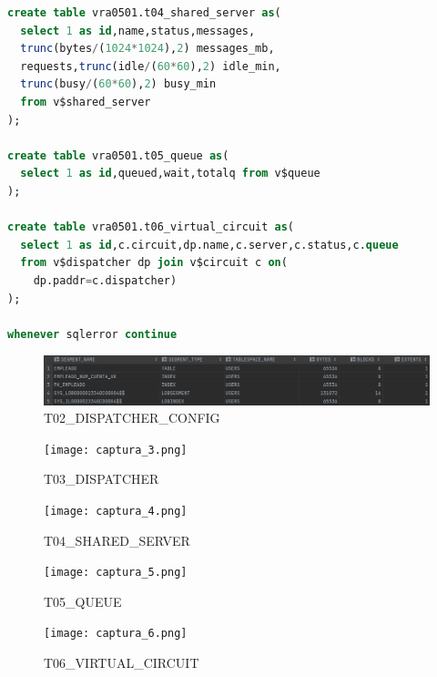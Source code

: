 \documentclass[journal]{IEEEtran}
\begin{document}
\begin{lstlisting}[language=sql, caption=s-03-consultas.sql,label={lst:codigo5}]
create table vra0501.t04_shared_server as(
  select 1 as id,name,status,messages,
  trunc(bytes/(1024*1024),2) messages_mb, 
  requests,trunc(idle/(60*60),2) idle_min,
  trunc(busy/(60*60),2) busy_min
  from v$shared_server
);

create table vra0501.t05_queue as(
  select 1 as id,queued,wait,totalq from v$queue
);

create table vra0501.t06_virtual_circuit as(
  select 1 as id,c.circuit,dp.name,c.server,c.status,c.queue
  from v$dispatcher dp join v$circuit c on( 
    dp.paddr=c.dispatcher)
);

whenever sqlerror continue
\end{lstlisting}
\begin{figure}[H]
  \centering
  \includegraphics[scale=.22]{captura_2.png}
   \caption{T02\_DISPATCHER\_CONFIG}
   \label{fig:validador_2}
\end{figure}
\begin{figure}[H]
  \centering
  \texttt{[image: captura\_3.png]}
   \caption{T03\_DISPATCHER}
   \label{fig:validador_3}
\end{figure}
\begin{figure}[H]
  \centering
  \texttt{[image: captura\_4.png]}
   \caption{T04\_SHARED\_SERVER}
   \label{fig:validador_4}
\end{figure}
\begin{figure}[H]
  \centering
  \texttt{[image: captura\_5.png]}
   \caption{T05\_QUEUE}
   \label{fig:validador_5}
\end{figure}
\begin{figure}[H]
  \centering
  \texttt{[image: captura\_6.png]}
   \caption{T06\_VIRTUAL\_CIRCUIT}
   \label{fig:validador_6}
\end{figure}
\end{document}
